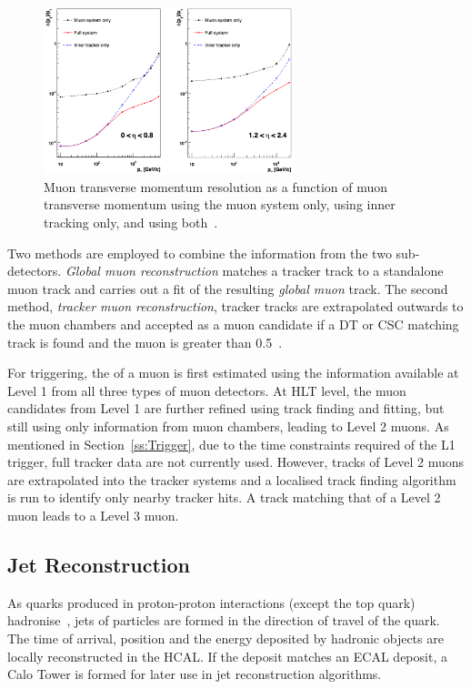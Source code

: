 \begin{figure}[hbtp]
   \centering
     \includegraphics[width=0.65\textwidth]{Chapters/02_Detector/Images/muon_momentum_resolution.png}\hfill
     \caption[Muon transverse momentum resolution using muon system and the tracking system.]{Muon transverse
     momentum resolution as a function of muon transverse momentum using the muon system only, using inner tracking only,
     and using both~\cite{Chatrchyan:2012xdj}.}
     \label{fig:muon_momentum_resolution}
\end{figure}

Two methods are employed to combine the information from the two sub-detectors. \textit{Global muon
reconstruction} matches a tracker track to a standalone muon track and carries out a fit of the resulting
\textit{global muon} track. The second method, \textit{tracker muon reconstruction}, tracker tracks are
extrapolated outwards to the muon chambers and accepted as a muon candidate if a DT or CSC matching track is
found and the muon \pt is greater than 0.5\GeV~\cite{muon_reconstruction}.

For triggering, the \pt of a muon is first estimated using the information available at Level 1 from all three
types of muon detectors. At HLT level, the muon candidates from Level 1 are further refined using track
finding and fitting, but still using only information from muon chambers, leading to Level 2 muons. As
mentioned in Section~\ref{ss:Trigger}, due to the time constraints required of the L1 trigger, full tracker
data are not currently used. However, tracks of Level 2 muons are extrapolated into the tracker systems and a
localised track finding algorithm is run to identify only nearby tracker hits. A track matching that of a
Level 2 muon leads to a Level 3 muon. %

\subsection{Jet Reconstruction}
\label{ss:jet_reconstruction}
As quarks produced in proton-proton interactions (except the top quark) hadronise~\cite{Griffiths:1987tj},
jets of particles are formed in the direction of travel of the quark. The time of arrival, position and the
energy deposited by hadronic objects are locally reconstructed in the HCAL. If the deposit matches an ECAL
deposit, a Calo Tower is formed for later use in jet reconstruction algorithms.

